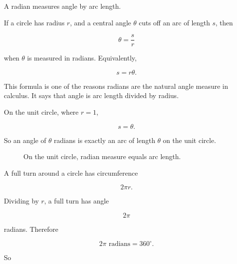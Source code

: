 A radian measures angle by arc length.

If a circle has radius \(r\), and a central angle \(\theta\) cuts off an arc of length \(s\),
then

\[
\boxed{
\theta=\frac{s}{r}
}
\]

when \(\theta\) is measured in radians.  Equivalently,

\[
\boxed{
s=r\theta.
}
\]

This formula is one of the reasons radians are the natural angle measure in calculus.
It says that angle is arc length divided by radius.

On the unit circle, where \(r=1\),

\[
s=\theta.
\]

So an angle of \(\theta\) radians is exactly an arc of length \(\theta\) on the unit circle.

\begin{figure}[h]
\centering
{}
\caption{On the unit circle, radian measure equals arc length.}
\label{fig:appendix-unit-circle-arc}
\end{figure}

A full turn around a circle has circumference

\[
2\pi r.
\]

Dividing by \(r\), a full turn has angle

\[
2\pi
\]

radians.  Therefore

\[
\boxed{
2\pi\text{ radians}=360^\circ.
}
\]

So

